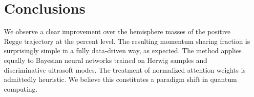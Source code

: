 \section{Conclusions}\label{sec:conclusions}

We observe a clear improvement over the hemisphere masses of the
positive Regge trajectory at the percent level. The resulting momentum
sharing fraction is surprisingly simple in a fully data-driven way, as
expected. The method applies equally to Bayesian neural networks trained
on Herwig samples and discriminative ultrasoft modes. The treatment of
normalized attention weights is admittedly heuristic. We believe this
constitutes a paradigm shift in quantum computing.

